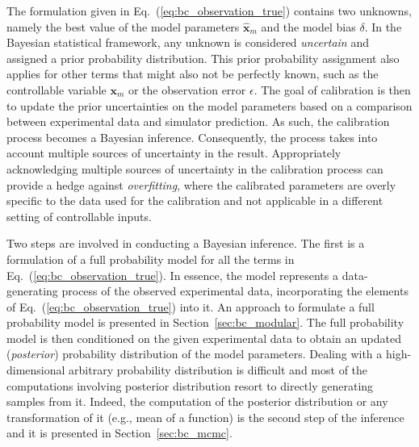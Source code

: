 The formulation given in Eq.~(\ref{eq:bc_observation_true}) contains two unknowns, namely the best value of the model parameters $\hat{\bm{x}}_m$ and the model bias $\delta$.
In the Bayesian statistical framework, any unknown is considered \emph{uncertain} and assigned a prior probability distribution.
This prior probability assignment also applies for other terms that might also not be perfectly known, such as the controllable variable $\bm{x}_m$ or the observation error $\epsilon$. 
The goal of calibration is then to update the prior uncertainties on the model parameters based on a comparison between experimental data and simulator prediction.
As such, the calibration process becomes a Bayesian inference.
Consequently, the process takes into account multiple sources of uncertainty in the result.
Appropriately acknowledging multiple sources of uncertainty in the calibration process can provide a hedge against \emph{overfitting}, where the calibrated parameters are overly specific to the data used for the calibration and not applicable in a different setting of controllable inputs.

Two steps are involved in conducting a Bayesian inference.
The first is a formulation of a full probability model for all the terms in Eq.~(\ref{eq:bc_observation_true}).
In essence, the model represents a data-generating process of the observed experimental data,
incorporating the elements of Eq.~(\ref{eq:bc_observation_true}) into it.
An approach to formulate a full probability model is presented in Section~\ref{sec:bc_modular}.
The full probability model is then conditioned on the given experimental data to obtain an updated (\emph{posterior}) probability distribution of the model parameters.
Dealing with a high-dimensional arbitrary probability distribution is difficult and most of the computations involving  posterior distribution resort to directly generating samples from it. 
Indeed, the computation of the posterior distribution or any transformation of it (e.g., mean of a function) is the second step of the inference and it is presented in Section~\ref{sec:bc_mcmc}.
